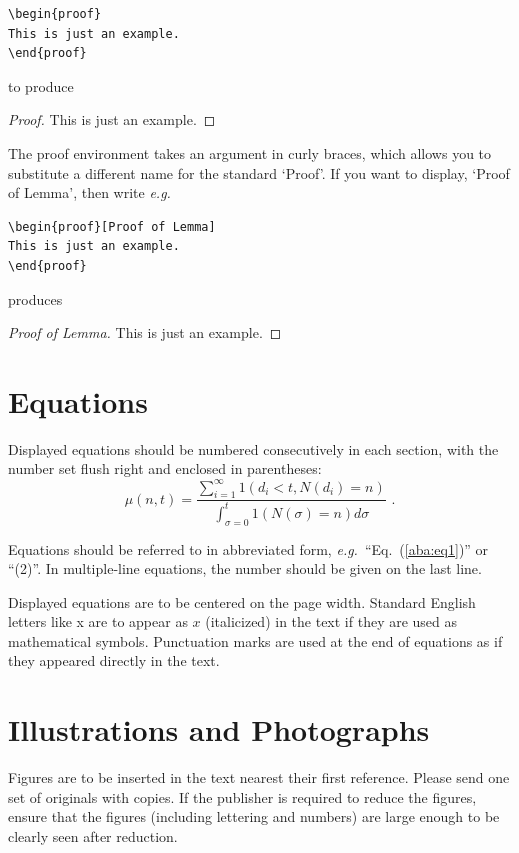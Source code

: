 \documentclass{ws-jai}
\begin{document}
\begin{verbatim}
\begin{proof}
This is just an example.
\end{proof}
\end{verbatim}

\noindent to produce

\begin{proof}
This is just an example.
\end{proof}

The proof environment takes an argument in curly
braces, which allows you to substitute a different name for the standard
`Proof'. If you want to display, `Proof of Lemma', then write {\it e.g.}

\begin{verbatim}
\begin{proof}[Proof of Lemma]
This is just an example.
\end{proof}
\end{verbatim}

\noindent produces

\begin{proof}[Proof of Lemma]
This is just an example.
\end{proof}

\section{Equations}
\noindent Displayed equations should be numbered consecutively in
each section, with the number set flush right and enclosed in
parentheses:
\begin{equation}
\mu(n, t) = \frac{\displaystyle\sum^\infty_{i=1} 1(d_i < t, N(d_i) = n)}
{\displaystyle\int^t_{\sigma=0} 1(N(\sigma) = n)d\sigma}\,\,
.\label{aba:eq1}
\end{equation}

\noindent Equations should be referred to in abbreviated form,
{\it e.g.}~``Eq.~(\ref{aba:eq1})'' or ``(2)''. In multiple-line equations,
the number should be given on the last line.

Displayed equations are to be centered on the page width. Standard
English letters like x are to appear as $x$ (italicized) in the
text if they are used as mathematical symbols. Punctuation marks
are used at the end of equations as if they appeared directly in
the text.

\section{Illustrations and Photographs}
Figures are to be inserted in the text nearest their
first reference. Please send one set of originals with copies. If the
publisher is required to reduce the figures, ensure that the
figures (including lettering and numbers) are large enough to be
clearly seen after reduction.
\end{document}
